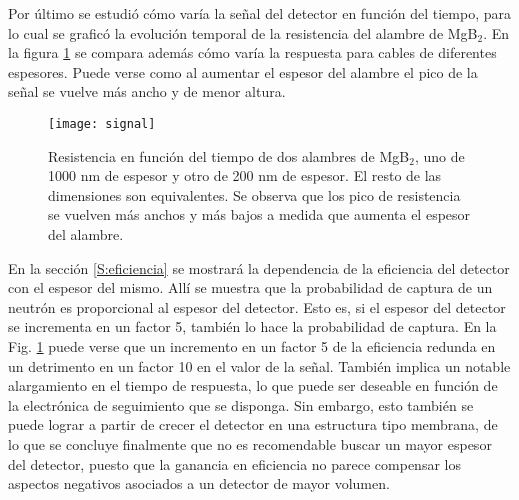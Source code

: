 Por último se estudió cómo varía la señal del detector en función del tiempo, para lo cual se graficó la evolución temporal de la resistencia del alambre de MgB$_2$. En la figura \ref{fig:signal} se compara además cómo varía la respuesta para cables de diferentes espesores. Puede verse como al aumentar el espesor del alambre el pico de la señal se vuelve más ancho y de menor altura. 
\begin{figure}[h!]
 \begin{center}
    \texttt{[image: signal]}
  \end{center}
  \caption[Resistencia en función del tiempo de dos alambres de MgB$_2$, uno de 1000 nm de espesor y otro de 200 nm de espesor.]{Resistencia en función del tiempo de dos alambres de MgB$_2$, uno de 1000 nm de espesor y otro de 200 nm de espesor. El resto de las dimensiones son equivalentes. Se observa que los pico de resistencia se vuelven más anchos y más bajos a medida que aumenta el espesor del alambre.}
\label{fig:signal}
\end{figure}

En la sección \ref{S:eficiencia} se mostrará la dependencia de la eficiencia del detector con el espesor del mismo.  Allí se muestra que la probabilidad de captura de un neutrón es proporcional al espesor del detector. Esto es, si el espesor del detector se incrementa en un factor 5, también lo hace la probabilidad de captura. En la Fig. \ref{fig:signal} puede verse que un incremento en un factor 5 de la eficiencia redunda en un detrimento en un factor 10 en el valor de la señal. También implica un notable alargamiento en el tiempo de respuesta, lo que puede ser deseable en función de la electrónica de seguimiento que se disponga. Sin embargo, esto también se puede lograr a partir de crecer el detector en una estructura tipo membrana, de lo que se concluye finalmente que no es recomendable buscar un mayor espesor del detector, puesto que la ganancia en eficiencia no parece compensar los aspectos negativos asociados a un detector de mayor volumen.
